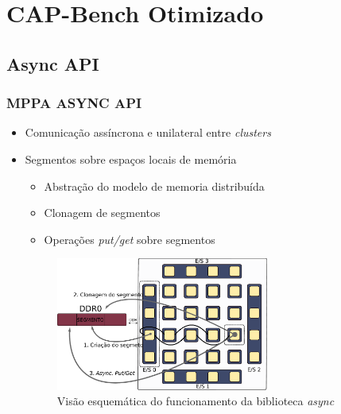 \documentclass[xcolor={table}]{beamer}
\begin{document}
\section{CAP-Bench Otimizado}
\subsection{Async API}
\begin{frame}\frametitle{MPPA ASYNC API \cite{Hascoet2017}}
    \begin{itemize}
        \item {Comunicação assíncrona e unilateral entre \textit{clusters}}
        \item {Segmentos sobre espaços locais de memória}
    	\begin{itemize}
        	\item Abstração do modelo de memoria distribuída
        	\item Clonagem de segmentos
        	\item Operações \textit{put/get} sobre segmentos
    	\end{itemize}
		\begin{figure}
    	\centering
        \includegraphics[width=7cm, keepaspectratio]{figs/putget.pdf}\caption{Visão esquemática do funcionamento da biblioteca \textit{async}}\label{fig:putget}
		\end{figure}
    \end{itemize}
\end{frame}
\end{document}
